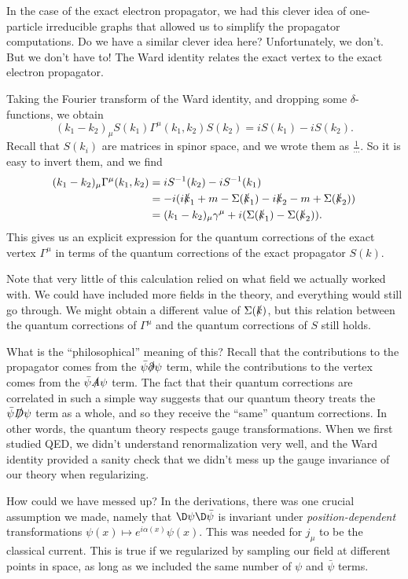 \documentclass[a4paper]{article}
\begin{document}
In the case of the exact electron propagator, we had this clever idea of one-particle irreducible graphs that allowed us to simplify the propagator computations. Do we have a similar clever idea here? Unfortunately, we don't. But we don't have to! The Ward identity relates the exact vertex to the exact electron propagator.

Taking the Fourier transform of the Ward identity, and dropping some $\delta$-functions, we obtain
\[
  (k_1 - k_2)_\mu S(k_1) \Gamma^\mu (k_1, k_2) S(k_2) = i S(k_1) - i S(k_2).
\]
Recall that $S(k_i)$ are matrices in spinor space, and we wrote them as $\frac{1}{\cdots}$. So it is easy to invert them, and we find
\begin{align*}
  (k_1 - k_2)_\mu \Gamma^\mu(k_1, k_2) &= i S^{-1}(k_2) - i S^{-1}(k_1)\\
  &= -i (i \slashed{k}_1 + m - \Sigma(\slashed{k}_1) - i \slashed{k}_2 - m + \Sigma(\slashed{k}_2))\\
  &= (k_1 - k_2)_\mu \gamma^\mu + i (\Sigma(\slashed{k}_1) - \Sigma(\slashed{k}_2)).
\end{align*}
This gives us an explicit expression for the quantum corrections of the exact vertex $\Gamma^\mu$ in terms of the quantum corrections of the exact propagator $S(k)$.

Note that very little of this calculation relied on what field we actually worked with. We could have included more fields in the theory, and everything would still go through. We might obtain a different value of $\Sigma(\slashed{k})$, but this relation between the quantum corrections of $\Gamma^\mu$ and the quantum corrections of $S$ still holds.

What is the ``philosophical'' meaning of this? Recall that the contributions to the propagator comes from the $\bar\psi \slashed{\partial} \psi$ term, while the contributions to the vertex comes from the $\bar\psi \slashed{A} \psi$ term. The fact that their quantum corrections are correlated in such a simple way suggests that our quantum theory treats the $\bar\psi \slashed{D} \psi$ term as a whole, and so they receive the ``same'' quantum corrections. In other words, the quantum theory respects gauge transformations. When we first studied QED, we didn't understand renormalization very well, and the Ward identity provided a sanity check that we didn't mess up the gauge invariance of our theory when regularizing.

How could we have messed up? In the derivations, there was one crucial assumption we made, namely that $\D \psi \D \bar\psi$ is invariant under \emph{position-dependent} transformations $\psi(x) \mapsto e^{i\alpha(x)} \psi(x)$. This was needed for $j_\mu$ to be the classical current. This is true if we regularized by sampling our field at different points in space, as long as we included the same number of $\psi$ and $\bar\psi$ terms.
\end{document}
